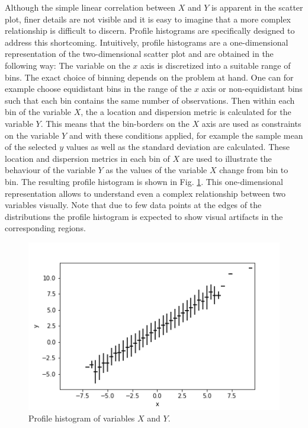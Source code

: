 \documentclass[BCOR=1mm, DIV=calc,10pt,
twoside=true,
twocolumn,
headings=normal]{scrartcl}
\newcommand{\fig}{Fig. }
\begin{document}
Although the simple linear correlation between $X$ and $Y$ is apparent in the scatter plot, finer details are not visible and it is easy to imagine that a more complex relationship is difficult to discern. Profile histograms are specifically designed to address this shortcoming. Intuitively, profile histograms are a one-dimensional representation of the two-dimensional scatter plot and are obtained  in the following way: The variable on the $x$ axis is discretized into a suitable range of bins. The exact choice of binning depends on the problem at hand. One can for example choose equidistant bins in the range of the $x$ axis or non-equidistant bins such that each bin contains the same number of observations. Then within each bin of the variable $X$, the a location and dispersion metric is calculated for the variable $Y$. This means that the bin-borders on the $X$ axis are used as constraints on the variable $Y$ and with these conditions applied, for example the sample mean of the selected $y$ values as well as the standard deviation are calculated. These location and dispersion metrics in each bin of $X$ are used to illustrate the behaviour of the variable $Y$ as the values of the variable $X$ change from bin to bin. The resulting profile histogram is shown in \fig \ref{fig:profile}. This one-dimensional representation allows to understand even a complex relationship between two variables visually. Note that due to few data points at the edges of the distributions the profile histogram is expected to show visual artifacts in the corresponding regions.

 \begin{figure}
\begin{center}
\includegraphics[scale=0.5]{../figures/profile}
\caption{\label{fig:profile} Profile histogram of variables $X$ and $Y$.}
\end{center}
\end{figure}
\end{document}
